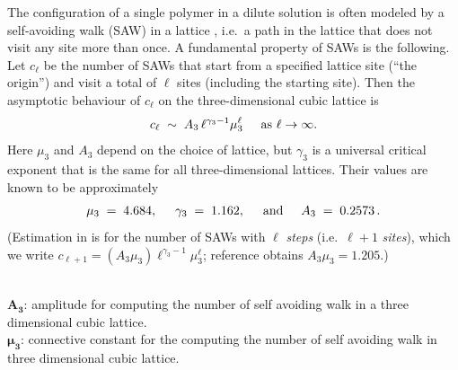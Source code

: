 \documentclass[12pt,letterpaper]{article}
\begin{document}
\begin{tcolorbox}[sharp corners, colback=green!30, colframe=green!80!blue, title=Brief Review of Self Avoiding Walks]
The configuration  of a single  polymer in a dilute solution is often modeled by
a self-avoiding walk (SAW) in a lattice \cite{MadrasNotes2019}, i.e.\  a path in the lattice that does not visit any site more than once.
A fundamental property of SAWs is the following.  
Let $c_{\ell}$ be
the number of SAWs that start from a specified lattice site (``the origin'') and visit a total of $\ell$ sites
(including the starting site).   Then the 
asymptotic behaviour of $c_{\ell}$ on the three-dimensional cubic lattice is \cite{MadrasNotes2019}
\begin{equation}
    \label{eq.sawscale}
       c_{\ell}  \;\sim  \;  A_3 \, {\ell}^{\gamma_3-1}  \mu_3^{\ell}    \hspace{5mm}\hbox{as $\ell\rightarrow\infty$}.
\end{equation}
Here $\mu_3$ and $A_3$ depend on the choice of lattice, but $\gamma_3$ is a universal critical exponent
that is the same for all three-dimensional lattices.  
Their values are known to be approximately \cite{chen2002universal, madras2013self}
\begin{equation}
   \label{eq.gammas}   \mu_3 \;=\;  4.684, \hspace{5mm}
        \gamma_3 \;=\;  1.162,    \hspace{5mm}\hbox{and}\hspace{5mm}
    A_3  \;=\;    0.2573  \,.  %
\end{equation}
(Estimation in \cite{chen2002universal} is for the 
number of SAWs with $\ell$ \textit{steps} (i.e.\ $\ell+1$ \textit{sites}), which we write  $c_{\ell+1}=(A_3\mu_3)\ell^{\gamma_3-1}\mu_3^{\ell}$; reference \cite{chen2002universal} obtains $A_3\mu_3=1.205$.)
\end{tcolorbox}
\text{}\\

$\boldsymbol{A_3}$: amplitude for computing the number of self avoiding walk in a three dimensional cubic lattice.\\

$\boldsymbol{\mu_3}$: connective constant for the computing the number of self avoiding walk in three dimensional cubic lattice.\\
\end{document}
